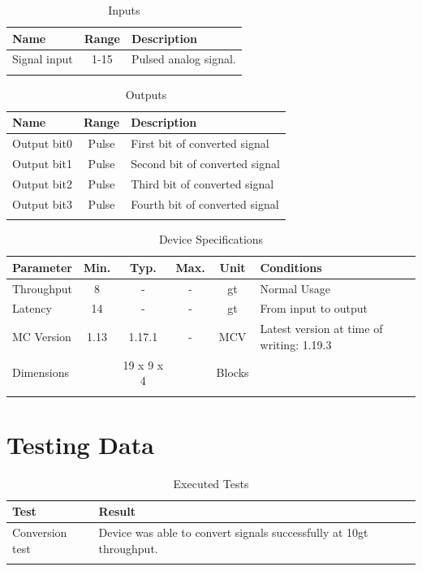 \documentclass[10pt]{datasheet}
\begin{document}
\begin{table}[h]
    \caption{Inputs}
    \begin{tabularx}{\textwidth}{l | c | X}
        \thickhline
        \textbf{Name} & \textbf{Range} & \textbf{Description} \\
        \hline
        Signal input & 1-15 & Pulsed analog signal. \\
        \thickhline
\end{tabularx}
\end{table}

\begin{table}[h]
    \caption{Outputs}
    \begin{tabularx}{\textwidth}{l | c | X}
        \thickhline
        \textbf{Name} & \textbf{Range} & \textbf{Description} \\
        \hline
        Output bit0 & Pulse & First bit of converted signal \\
        Output bit1 & Pulse & Second bit of converted signal \\
        Output bit2 & Pulse & Third bit of converted signal \\
        Output bit3 & Pulse & Fourth bit of converted signal \\
        \thickhline
\end{tabularx}
\end{table}

\begin{table}[h]
    \caption{Device Specifications}
    \begin{tabularx}{\textwidth}{l | c c c | c | X}
        \thickhline
        \textbf{Parameter} & \textbf{Min.} & \textbf{Typ.} & \textbf{Max.} &
        \textbf{Unit} & \textbf{Conditions} \\
        \hline
        Throughput  & 8 & - & - & gt & Normal Usage \\
        \hline
        Latency    & 14 & - & - & gt & From input to output \\
        \hline
        MC Version & 1.13 & 1.17.1 & - & MCV & Latest version at time of writing: 1.19.3\\
        \hline
        Dimensions & & 19 x 9 x 4 & & Blocks & \\
        \thickhline
\end{tabularx}
\end{table}
\newpage
\section{Testing Data}
\begin{table}[h]
\caption{Executed Tests}
\begin{tabularx}{\textwidth}{l | X}
    \thickhline
    \textbf{Test} & \textbf{Result} \\
    \hline
    Conversion test & Device was able to convert signals successfully at 10gt throughput. \\
    \thickhline
\end{tabularx}
\end{table}
\end{document}
